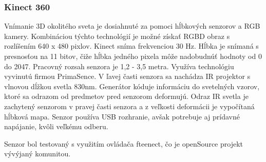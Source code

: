 \subsubsection{Kinect 360}
Vnímanie 3D okolitého sveta je dosiahnuté za pomoci hĺbkových senzorov a RGB kamery. Kombináciou týchto technológií je možné získať RGBD obraz s rozlíšením 640 x 480 pixlov.  Kinect sníma frekvenciou 30 Hz. Hĺbka je snímaná s presnosťou na 11 bitov, čiže hĺbka jedného pixela môže nadobudnúť hodnoty od 0 do 2047.  Pracovný rozsah senzora je  1,2 - 3,5 metra.  Využíva technológiu vyvinutú firmou PrimaSence.  V ľavej časti senzora sa nachádza IR projektor s vlnovou dĺžkou svetla 830nm. Generátor kóduje informáciu do svetelných vzorov, ktoré sa odrazom od predmetov pred senzorom deformujú.  Odraz IR svetla je zachytený senzorom v pravej časti senzora a z veľkosti deformácii je vypočítaná hĺbková mapa. Senzor používa USB rozhranie, avšak potrebuje aj prídavné napájanie, kvôli veľkému odberu.

Senzor bol testovaný s využitím ovládača fteenect, čo je openSource projekt vývýjaný komunitou.













